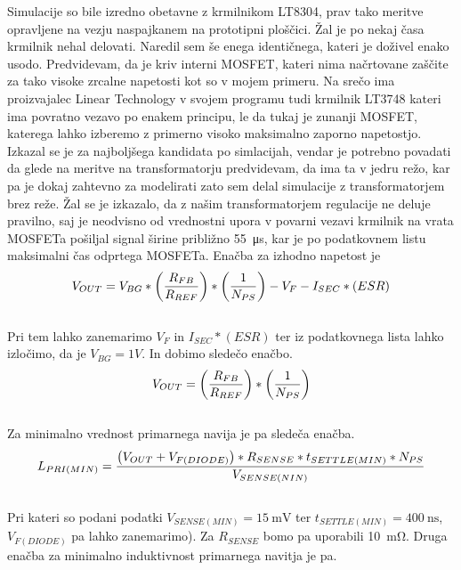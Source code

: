 \documentclass[a4paper,twoside,openright,12pt,slovene]{book}
\begin{document}
    Simulacije so bile izredno obetavne z krmilnikom LT8304, prav tako meritve opravljene na vezju naspajkanem na prototipni ploščici. Žal je po nekaj časa krmilnik nehal delovati. Naredil sem še enega identičnega, kateri je doživel enako usodo. Predvidevam, da je kriv interni MOSFET, kateri nima načrtovane zaščite za tako visoke zrcalne napetosti kot so v mojem primeru. Na srečo ima proizvajalec Linear Technology v svojem programu tudi krmilnik LT3748 kateri ima povratno vezavo po enakem principu, le da tukaj je zunanji MOSFET, katerega lahko izberemo z primerno visoko maksimalno zaporno napetostjo.
    Izkazal se je za najboljšega kandidata po simlacijah, vendar je potrebno povadati da glede na meritve na transformatorju predvidevam, da ima ta v jedru režo, kar pa je dokaj zahtevno za modelirati zato sem delal simulacije z transformatorjem brez reže. Žal se je izkazalo, da z našim transformatorjem regulacije ne deluje pravilno, saj je neodvisno od vrednostni upora v povarni vezavi krmilnik na vrata MOSFETa pošiljal signal širine približno \SI{55}{\micro\second}, kar je po podatkovnem listu maksimalni čas odprtega MOSFETa. Enačba za izhodno napetost je 
    \begin{equation}
       \\ V_{OUT}=V_{BG}*\left(\frac{R_{FB}} {R_{REF}} \right)*\left(\frac{1} {N_{PS}} \right) - V_{F} - I_{SEC}*(ESR) 
    \end{equation}
    \\Pri tem lahko zanemarimo \(V_{F}\) in \(I_{SEC}*(ESR)\) ter iz podatkovnega lista lahko izločimo, da je \(V_{BG}=1V\). In dobimo sledečo enačbo.
    \begin{equation}
       \\ V_{OUT} = \left(\frac{R_{FB}} {R_{REF}} \right)*\left(\frac{1} {N_{PS}} \right)
    \end{equation}
    \\Za minimalno vrednost primarnega navija je pa sledeča enačba.
    \begin{equation}
       \\ L_{PRI(MIN)} = \frac{\left(V_{OUT} + V_{F(DIODE)}\right) * R_{SENSE} * t_{SETTLE(MIN)} * N_{PS}} {V_{SENSE(NIN)}}
    \end{equation}
    ~\\Pri kateri so podani podatki \(V_{SENSE(MIN)}=\SI{15}{\milli\volt}\) ter \(t_{SETTLE(MIN)}=\SI{400}{\nano\second}\), \(V_{F(DIODE)}\) pa lahko zanemarimo). Za \(R_{SENSE}\) bomo pa uporabili \SI{10}{\milli\ohm}. Druga enačba za minimalno induktivnost primarnega navitja je pa.
\end{document}
